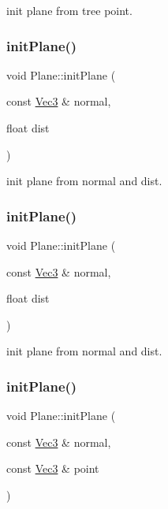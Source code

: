init plane from tree point. \mbox{\label{classPlane_af071cae496399c411970511639c978ef}} 
\subsubsection{\texorpdfstring{init\+Plane()}{initPlane()}\hspace{0.1cm}{\footnotesize\ttfamily [3/6]}}
{\footnotesize\ttfamily void Plane\+::init\+Plane (\begin{DoxyParamCaption}\item[{const \hyperlink{classVec3}{Vec3} \&}]{normal,  }\item[{float}]{dist }\end{DoxyParamCaption})}

init plane from normal and dist. \mbox{\label{classPlane_af071cae496399c411970511639c978ef}} 
\subsubsection{\texorpdfstring{init\+Plane()}{initPlane()}\hspace{0.1cm}{\footnotesize\ttfamily [4/6]}}
{\footnotesize\ttfamily void Plane\+::init\+Plane (\begin{DoxyParamCaption}\item[{const \hyperlink{classVec3}{Vec3} \&}]{normal,  }\item[{float}]{dist }\end{DoxyParamCaption})}

init plane from normal and dist. \mbox{\label{classPlane_a648afe6850294d33355f7c4625fffe4f}} 
\subsubsection{\texorpdfstring{init\+Plane()}{initPlane()}\hspace{0.1cm}{\footnotesize\ttfamily [5/6]}}
{\footnotesize\ttfamily void Plane\+::init\+Plane (\begin{DoxyParamCaption}\item[{const \hyperlink{classVec3}{Vec3} \&}]{normal,  }\item[{const \hyperlink{classVec3}{Vec3} \&}]{point }\end{DoxyParamCaption})}

